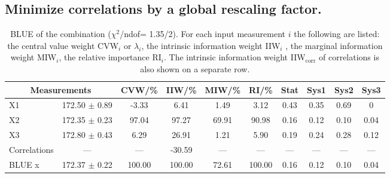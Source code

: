 \clearpage
\subsection{Minimize correlations by a global rescaling factor.}
\begin{table}[H]
\scriptsize
\begin{center}
\renewcommand{\arraystretch}{1.1}
\begin{tabular}{|lc|c|c|c|c|cccc|}
\hline
\multicolumn{2}{|c|}{Measurements} & CVW/\%  & IIW/\%  & MIW/\%  & RI/\%  & {\tiny Stat} & {\tiny Sys1} & {\tiny Sys2} & {\tiny Sys3}\\
\hline
X1 &     172.50 $\pm$       0.89 &      -3.33 &       6.41 &       1.49 &       3.12 &       0.43 &       0.35 &       0.69 &  0\\
X2 &     172.35 $\pm$       0.23 &      97.04 &      97.27 &      69.91 &      90.98 &       0.16 &       0.12 &       0.10 &       0.04\\
X3 &     172.80 $\pm$       0.43 &       6.29 &      26.91 &       1.21 &       5.90 &       0.19 &       0.24 &       0.28 &       0.12\\
Correlations & --- & --- &     -30.59 & --- & --- & --- & --- & --- & ---\\
\hline
BLUE {\tiny x} &     172.37 $\pm$       0.22 &     100.00 &     100.00 &      72.61 &     100.00 &       0.16 &       0.12 &       0.10 &       0.04\\
\hline
\end{tabular}
\caption{BLUE of the combination ($\chi^2$/ndof=      1.35/2).
 For each input measurement $i$ the following are listed: the central value weight CVW$_i$ or $\lambda_i$, the intrinsic information weight IIW$_i$ , the marginal information weight MIW$_i$, the relative importance RI$_i$. The intrinsic information weight IIW$_{\mathrm{corr}}$ of correlations is also shown on a separate row.}
\renewcommand{\arraystretch}{1}
\end{center}
\end{table}
